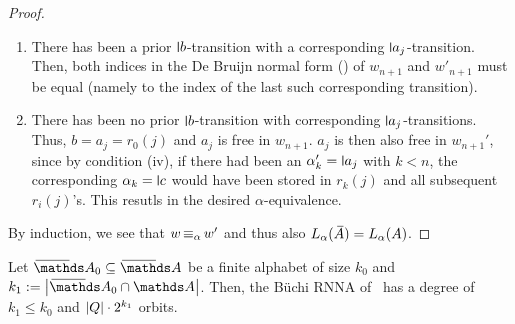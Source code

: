\documentclass[a4paper,UKenglish,cleveref,autoref,thm-restate,numberwithinsect,final]{lipics-v2021}
\begin{document}
\begin{proof}
\begin{enumerate}
        \item There has been a prior $\newletter{b}$-transition with a corresponding $\newletter{a_j}$-transition.
          Then, both indices in the De Bruijn normal form () of $w_{n + 1}$ and $w'_{n + 1}$
          must be equal (namely to the index of the last such corresponding transition).
        \item There has been no prior $\newletter{b}$-transition with corresponding $\newletter{a_j}$-transitions.
          Thus, $b = a_j = r_0(j)$ and $a_j$ is free in $w_{n + 1}$. $a_j$ is then also free in $w_{n + 1}'$, since
          by condition (iv), if there had been an $\alpha'_{k} = \newletter{a_j}$ with $k < n$, the corresponding 
          $\alpha_k = \newletter{c}$ would have been stored in $r_k(j)$ and all subsequent $r_{i}(j)$'s. This
          resutls in the desired $\alpha$-equivalence.
      \end{enumerate}
      By induction, we see that $w \operatorname{\equiv_{\alpha}} w'$ and thus also $L_\alpha(\barA) = L_\alpha(A)$.
    \end{proof}

    \begin{rem}
      Let $\barNames_0 \seq \barNames$ be a finite alphabet of size $k_0$ and ${k_1 := \card{\barNames_0 \cap \names}}$.
      Then, the Büchi RNNA of~ has a degree of
      $k_1 \leqslant k_0$ and $\card{Q} \cdot 2^{k_1}$ orbits. 
    \end{rem}
    
\end{document}

